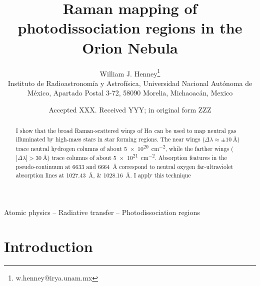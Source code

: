 \documentclass[useAMS, usenatbib, a4paper]{mnras}
\title[Raman mapping of Orion PDRs]
{Raman mapping of photodissociation regions in the Orion Nebula}
\author[Henney]{
  William J. Henney\thanks{w.henney@irya.unam.mx}\\
  \foreignlanguage{spanish}{Instituto de Radioastronomía y
    Astrofísica, Universidad Nacional Autónoma de México, Apartado
    Postal 3-72, 58090 Morelia, Michaoacán, Mexico}}
\date{Accepted XXX. Received YYY; in original form ZZZ}
\begin{document}
\label{firstpage}
\pagerange{\pageref{firstpage}--\pageref{lastpage}}
\maketitle



\begin{abstract}
  I show that the broad Raman-scattered wings of H\(\alpha\) can be used to
  map neutral gas illuminated by high-mass stars in star forming
  regions. The near wings
  (\(\Delta\lambda \approx \pm \SI{10}{\angstrom}\)) trace neutral hydrogen columns of
  about \SI{5e20}{cm^{-2}}, while the farther wings
  (\(|\Delta\lambda| > \SI{30}{\angstrom}\)) trace columns of about
  \SI{5e21}{cm^{-2}}. Absorption features in the pseudo-continuum at
  6633 and 6664~\AA{} correspond to neutral oxygen far-ultraviolet
  absorption lines at \SIlist{1027.43;1028.16}{\angstrom}.
  I apply this technique 
\end{abstract}
\begin{keywords}
  Atomic physics -- Radiative transfer -- Photodissociation regions
\end{keywords}
\section{Introduction}
\label{sec:introduction}
\end{document}
